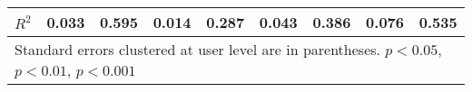 {\begin{tabular}{l*{8}{c}}
\(R^{2}\)           &       0.033         &       0.595         &       0.014         &       0.287         &       0.043         &       0.386         &       0.076         &       0.535         \\

\hline\hline
\multicolumn{9}{l}{\footnotesize Standard errors clustered at user level are in parentheses. \sym{*} \(p<0.05\), \sym{**} \(p<0.01\), \sym{***} \(p<0.001\)}\\
\end{tabular}
}
